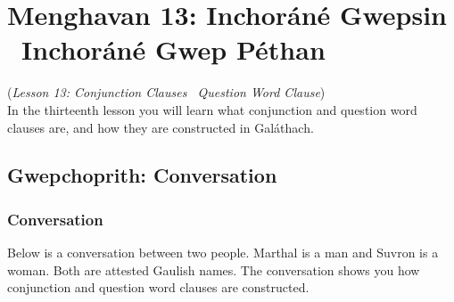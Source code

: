 \section{Menghavan 13: Inchor\'{a}n\'{e} Gwepsin \textendash\ Inchor\'{a}n\'{e} Gwep P\'{e}than}
(\textit{Lesson 13: Conjunction Clauses \textendash\ Question Word Clause})\\

In the thirteenth lesson you will learn what conjunction and question word clauses are, and how they are constructed in Gal\'{a}thach.

\subsection{Gwepchoprith: Conversation}
\subsubsection{Conversation}

Below is a conversation between two people. Marthal is a man and Suvron is a woman. Both are attested Gaulish names. The conversation shows you how conjunction and question word clauses are constructed.


